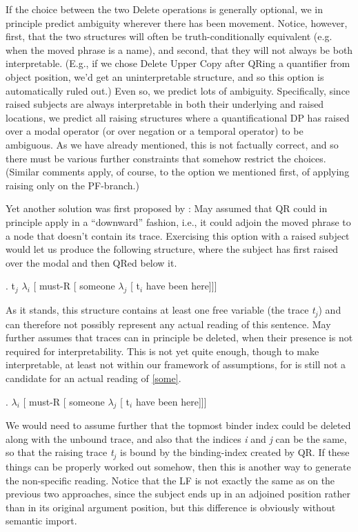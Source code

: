 If the choice between the two Delete operations is generally optional, we in principle predict ambiguity wherever there has been movement. Notice, however, first, that the two structures will often be truth-conditionally equivalent (e.g. when the moved phrase is a name), and second, that they will not always be both interpretable. (E.g., if we chose Delete Upper Copy after QRing a quantifier from object position, we'd get an uninterpretable structure, and so this option is automatically ruled out.) Even so, we predict lots of ambiguity. Specifically, since raised subjects are always interpretable in both their underlying and raised locations, we predict all raising structures where a quantificational DP has raised over a modal operator (or over negation or a temporal operator) to be ambiguous. As we have already mentioned, this is not factually correct, and so there must be various further constraints that somehow restrict the choices. (Similar comments apply, of course, to the option we mentioned first, of applying raising only on the PF-branch.)

Yet another solution was first proposed by \citet{may:1977:thesis}: May assumed that QR could in principle apply in a ``downward'' fashion, i.e., it could adjoin the moved phrase to a node that doesn't contain its trace. Exercising this option with a raised subject would let us produce the following structure, where the subject has first raised over the modal and then QRed below it.

\ex. t$_j$ $\lambda_i$ [ must-R [ someone $\lambda_j$ [ t$_i$ have been here]]]

As it stands, this structure contains at least one free variable (the trace \emph{t}$_j$) and can therefore not possibly represent any actual reading of this sentence. May further assumes that traces can in principle be deleted, when their presence is not required for interpretability. This is not yet quite enough, though to make \Last interpretable, at least not within our framework of assumptions, for \Next is still not a candidate for an actual reading of \ref{some}.

\ex. $\lambda_i$ [ must-R [ someone $\lambda_j$ [ t$_i$ have been here]]]

We would need to assume further that the topmost binder index could be deleted along with the unbound trace, and also that the indices \emph{i} and \emph{j} can be the same, so that the raising trace \emph{t}$_j$ is bound by the binding-index created by QR. If these things can be properly worked out somehow, then this is another way to generate the non-specific reading. Notice that the LF is not exactly the same as on the previous two approaches, since the subject ends up in an adjoined position rather than in its original argument position, but this difference is obviously without semantic import.

